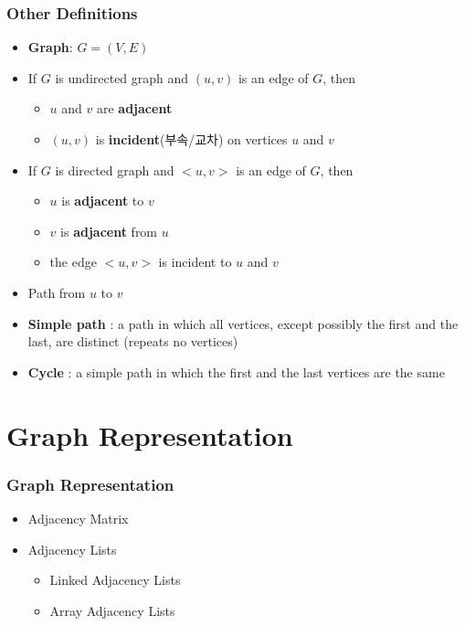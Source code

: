 \documentclass[newPxFont,sthlmFooter,nooffset]{beamer}
\begin{document}
\begin{frame}[t]
  \frametitle{Other Definitions}
  \begin{itemize}
  \item \textbf{Graph}: $G=(V,E)$
  \item  If $G$ is undirected graph and $(u,v)$ is an edge of $G$, then
    \begin{itemize}
    \item $u$ and $v$ are \textbf{adjacent}
    \item $(u,v)$ is \textbf{incident}(부속/교차) on vertices $u$ and $v$
    \end{itemize}

\item If $G$ is directed graph and $<u,v>$ is an edge of $G$, then
  \begin{itemize}
  \item $u$ is \textbf{adjacent} to $v$
  \item $v$ is \textbf{adjacent} from $u$
  \item the edge $<u, v>$ is incident to $u$ and $v$
  \end{itemize}

\item Path from $u$ to $v$
\item \textbf{Simple path} : a path in which all vertices, except
  possibly the first and the last, are distinct (repeats no vertices)
\item \textbf{Cycle} : a simple path in which the first and the last
  vertices are the same
  \end{itemize}
\end{frame}

\section{Graph Representation}
\begin{frame}[t]
  \frametitle{Graph Representation}
  \begin{itemize}
  \item Adjacency Matrix
  \item Adjacency Lists
    \begin{itemize}
    \item Linked Adjacency Lists
    \item Array Adjacency Lists
    \end{itemize}
  \end{itemize}
\end{frame}
\end{document}
